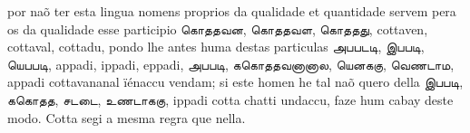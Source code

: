 \documentclass[12pt,a4paper]{scrbook}
\begin{document}
      

por naõ ter esta lingua nomens proprios da qualidade et quantidade servem pera os 
da qualidade esse participio கொததவன, கொததவள, கொததது, cottaven, cottaval, 
cottadu, pondo lhe antes huma destas particulas அபபடடி, இபபடி, யெபபடி, appadi, 
ippadi, eppadi, அபபடி, ககொததவனானால, யெனககு, வெணடாம, appadi cottavananal 
ïénaccu vendam; si este homen he tal naõ quero della இபபடி, ககொதத, சடடை, உணடாககு, 
ippadi cotta chatti undaccu, faze hum cabay deste modo. 
Cotta segi a mesma regra que nella. 
	
    
  
\@openrighttrue\makeatother
    
\end{document}
